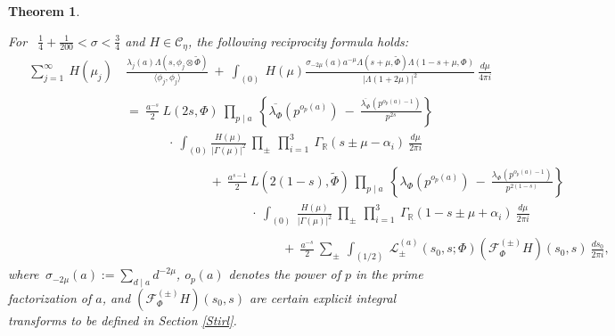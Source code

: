 \documentclass[11pt,reqno]{amsart}
\newtheorem{thm}{Theorem}[section]
\theoremstyle{definition}
\theoremstyle{definition}
\theoremstyle{remark}
\newcommand{\R}{\ensuremath{\mathbb{R}}}
\numberwithin{equation}{section}
\begin{document}
\begin{thm}\label{twisdirc}

	
\noindent For  \  $\frac{1}{4}+ \frac{1}{200}  <  \sigma  < \frac{3}{4}$ and $H\in \mathcal{C}_{\eta}$, the following reciprocity formula holds:
\begin{align}\label{dirimom}
\hspace{15pt} 	   \sum_{j=1}^{\infty} \  H\left(\mu_{j}\right)  & \   \frac{\lambda_{j}(a)\Lambda(s, \phi_{j}\otimes \widetilde{\Phi}) }{\langle \phi_{j}, \phi_{j}\rangle}  \ + \   \int_{(0)} \   H\left(\mu\right) 
\frac{ \sigma_{-2\mu}(a) a^{-\mu}\Lambda( s+\mu,   \widetilde{\Phi} )\Lambda\left( 1-s+\mu,   \Phi \right)}{\left|\Lambda(1+2\mu)\right|^2} \ \frac{d\mu}{4\pi i} \nonumber\\
&\nonumber\\[-0.2in]
 &    \ = \  \frac{ a^{-s}}{2}  \ L(2s, \Phi) \ \prod_{p\mid a} \ \left\{  \overline{\lambda_{\Phi}}\left(p^{o_{p}(a)}\right) \ - \   \frac{\overline{\lambda_{\Phi}}\left(p^{o_{p}(a)-1}\right) }{p^{2s}} \right\} \nonumber\\
&\hspace{40pt} \  \cdot  \  	   \int_{(0)}  \frac{H(\mu)}{|\Gamma(\mu)|^2} \ \prod_{\pm} \ \prod_{i=1}^{3} \ \Gamma_{\R}\left(s \pm \mu - \alpha_{i}\right) \ \frac{d\mu}{2\pi i} \nonumber\\
&\nonumber\\[-0.2in]
&\hspace{80pt}  \ + \  \frac{a^{s-1}}{2}  \    L( 2(1-s), \widetilde{\Phi})  \    \prod_{p\mid a} \ \left\{   \lambda_{\Phi}\left(p^{o_{p}(a)}\right) \ - \   \frac{\lambda_{\Phi}\left(p^{o_{p}(a)-1}\right) }{p^{2(1-s)}} \right\} \nonumber\\
& \hspace{120pt} \ \cdot \   \int_{(0)} \ \frac{H(\mu)}{\left|\Gamma(\mu)\right|^2} \ \prod_{\pm} \ \prod_{i=1}^{3} \ \Gamma_{\R}\left(1-s \pm \mu + \alpha_{i}\right) \ \frac{d\mu}{2\pi i} \nonumber\\
&\nonumber\\[-0.1in]
&\hspace{150pt} \ + \  \frac{a^{-s}}{2}  \   \sum_{\pm} \  \int_{(1/2)} \  	\mathcal{L}^{(a)}_{\pm}\left(s_{0}, s; \Phi \right)   (\mathcal{F}_{\Phi}^{(\pm)}H)\left(s_{0},  s\right) \ \frac{ds_{0}}{2\pi i},
\end{align}
where\,  $\sigma_{-2\mu}(a) :=   \sum_{d \mid a} d^{-2\mu}$,  $o_{p}(a)$ denotes the power of $p$ in the prime factorization of $a$,  and  $(\mathcal{F}_{\Phi}^{(\pm)} H)\left(s_{0},  s \right)$ are certain explicit integral transforms to be defined in Section \ref{Stirl}.

\end{thm}
\end{document}
